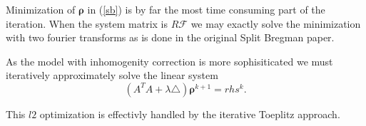 \documentclass[11pt]{amsart}
\theoremstyle{remark}
\begin{document}
Minimization of $\mathbf{\rho}$ in (\ref{sb}) is by far the most time
consuming part of the iteration. When the system matrix is
$R\mathcal{F}$ we may exactly solve the minimization with two fourier
transforms as is done in the original Split Bregman paper.

As the model with inhomogenity correction is more sophisiticated we must  iteratively approximately solve the linear system
\begin{equation}\label{toep}
(A^TA + \lambda \triangle)\mathbf{\rho}^{k+1} = rhs^{k}.
\end{equation}

This $l2$ optimization is effectivly handled by the iterative Toeplitz
approach.







\end{document}
